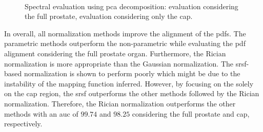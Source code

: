 \begin{figure}
  \centering
  \\
  \caption{Spectral evaluation using \acs*{pca} decomposition: \protect{} evaluation considering the full prostate, \protect{} evaluation considering only the \acs*{cap}.}
  \label{fig:qt}
\end{figure}

In overall, all normalization methods improve the alignment of the \acp{pdf}.
The parametric methods outperform the non-parametric while evaluating the \ac{pdf} alignment considering the full prostate organ.
Furthermore, the Rician normalization is more appropriate than the Gaussian normalization.
The \ac{srsf}-based normalization is shown to perform poorly which might be due to the instability of the mapping function inferred.
However, by focusing on the solely on the \ac{cap} region, the \ac{srsf} outperforms the other methods followed by the Rician normalization.
Therefore, the Rician normalization outperforms the other methods with an \ac{auc} of $99.74$ and $98.25$ considering the full prostate and \ac{cap}, respectively.

